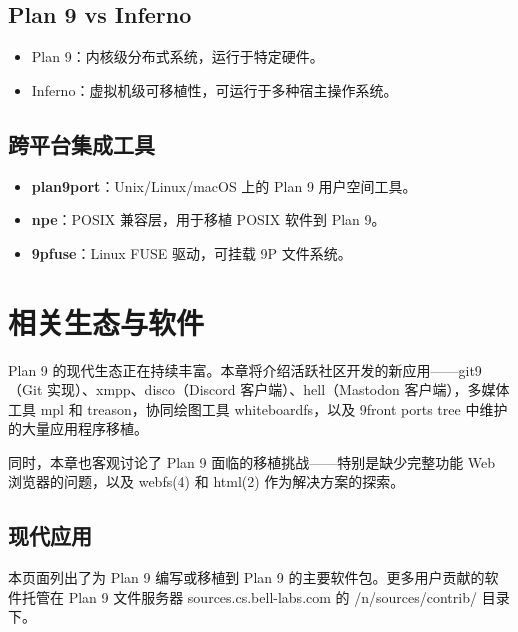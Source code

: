 \documentclass[12pt,UTF8]{ctexbook}
\begin{document}
\section{Plan 9 vs Inferno}

\begin{itemize}
\item Plan 9：内核级分布式系统，运行于特定硬件。
\item Inferno：虚拟机级可移植性，可运行于多种宿主操作系统。
\end{itemize}

\section{跨平台集成工具}

\begin{itemize}
\item \textbf{plan9port}：Unix/Linux/macOS 上的 Plan 9 用户空间工具。
\item \textbf{npe}：POSIX 兼容层，用于移植 POSIX 软件到 Plan 9。
\item \textbf{9pfuse}：Linux FUSE 驱动，可挂载 9P 文件系统。
\end{itemize}

\chapter{相关生态与软件}

Plan 9 的现代生态正在持续丰富。本章将介绍活跃社区开发的新应用——git9（Git 实现）、xmpp、disco（Discord 客户端）、hell（Mastodon 客户端），多媒体工具 mpl 和 treason，协同绘图工具 whiteboardfs，以及 9front ports tree 中维护的大量应用程序移植。

同时，本章也客观讨论了 Plan 9 面临的移植挑战——特别是缺少完整功能 Web 浏览器的问题，以及 webfs(4) 和 html(2) 作为解决方案的探索。

\section{现代应用}

本页面列出了为 Plan 9 编写或移植到 Plan 9 的主要软件包。更多用户贡献的软件托管在 Plan 9 文件服务器 sources.cs.bell-labs.com 的 /n/sources/contrib/ 目录下。
\end{document}
